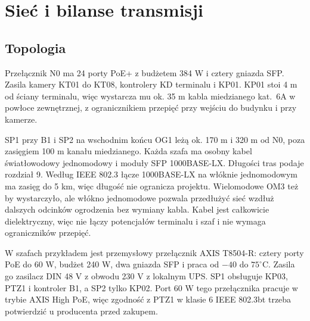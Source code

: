 \section{Sieć i bilanse transmisji}


\subsection*{Topologia}
Przełącznik N0 ma 24 porty PoE+ z budżetem 384 W i cztery gniazda SFP.\cite{S-SW} Zasila kamery KT01 do KT08, kontrolery KD terminalu i KP01. KP01 stoi 4 m od ściany terminalu, więc wystarcza mu ok. 35 m kabla miedzianego kat.~6A w powłoce zewnętrznej, z ogranicznikiem przepięć przy wejściu do budynku i przy kamerze.\cite{S-SPD}

SP1 przy B1 i SP2 na wschodnim końcu OG1 leżą ok. 170 m i 320 m od N0, poza zasięgiem 100 m kanału miedzianego. Każda szafa ma osobny kabel światłowodowy jednomodowy i moduły SFP 1000BASE-LX. Długości tras podaje rozdział 9. Według IEEE 802.3 łącze 1000BASE-LX na włóknie jednomodowym ma zasięg do 5 km, więc długość nie ogranicza projektu. Wielomodowe OM3 też by wystarczyło, ale włókno jednomodowe pozwala przedłużyć sieć wzdłuż dalszych odcinków ogrodzenia bez wymiany kabla. Kabel jest całkowicie dielektryczny, więc nie łączy potencjałów terminalu i szaf i nie wymaga ograniczników przepięć.

W szafach przykładem jest przemysłowy przełącznik AXIS T8504-R: cztery porty PoE do 60 W, budżet 240 W, dwa gniazda SFP i praca od $-40$ do $75^\circ$C. Zasila go zasilacz DIN 48 V z obwodu 230 V z lokalnym UPS.\cite{S-T8504} SP1 obsługuje KP03, PTZ1 i kontroler B1, a SP2 tylko KP02. Port 60 W tego przełącznika pracuje w trybie AXIS High PoE, więc zgodność z PTZ1 w klasie 6 IEEE 802.3bt trzeba potwierdzić u producenta przed zakupem.

